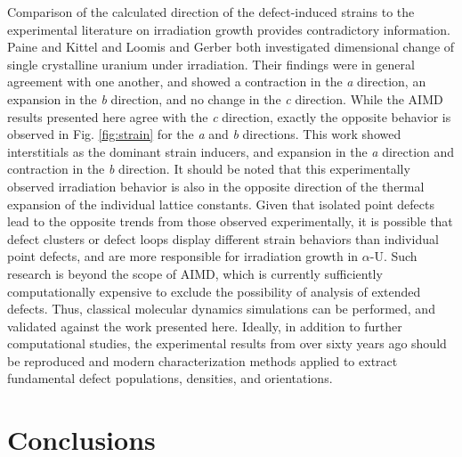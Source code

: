 \documentclass[review]{elsarticle}
\begin{document}
Comparison of the calculated direction of the defect-induced strains to the experimental literature on irradiation growth provides contradictory information. Paine and Kittel \cite{paine1958} and Loomis and Gerber \cite{loomis1968} both investigated dimensional change of single crystalline uranium under irradiation. Their findings were in general agreement with one another, and showed a contraction in the \textit{a} direction, an expansion in the \textit{b} direction, and no change in the \textit{c} direction. While the AIMD results presented here agree with the \textit{c} direction, exactly the opposite behavior is observed in Fig. \ref{fig:strain} for the \textit{a} and \textit{b} directions. This work showed interstitials as the dominant strain inducers, and expansion in the \textit{a} direction and contraction in the \textit{b} direction. It should be noted that this experimentally observed irradiation behavior is also in the opposite direction of the thermal expansion of the individual lattice constants. Given that isolated point defects lead to the opposite trends from those observed experimentally, it is possible that defect clusters or defect loops display different strain behaviors than individual point defects, and are more responsible for irradiation growth in $\alpha$-U. Such research is beyond the scope of AIMD, which is currently sufficiently computationally expensive to exclude the possibility of analysis of extended defects. Thus, classical molecular dynamics simulations can be performed, and validated against the work presented here. Ideally, in addition to further computational studies, the experimental results from over sixty years ago should be reproduced and modern characterization methods applied to extract fundamental defect populations, densities, and orientations. 

\section{Conclusions}
\end{document}
